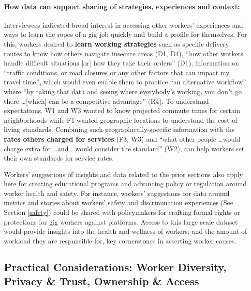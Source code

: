 \paragraph{How data can support sharing of strategies, experiences and context: }Interviewees indicated broad interest in accessing other workers' experiences and ways to learn the ropes of a gig job quickly and build a profile for themselves. For this, workers desired to \textbf{learn working strategies} such as specific delivery routes to know how others navigate insecure areas (D1, D4), ``how other workers handle difficult situations [or] how they take their orders'' (D1), information on ``traffic conditions, or road closures or any other factors that can impact my travel time'', which would even enable them to practice ``an alternative workflow'' where ``by taking that data and seeing where everybody's working, you don't go there  \dots  [which] can be a competitive advantage'' (R4). To understand expectations, W1 and W3 wanted to know projected commute times for certain neighborhoods while F1 wanted geographic locations to understand the cost of living standards. Combining such geographically-specific information with the
\textbf{rates others charged for services} (F3, W3) and ``what other people  \dots  would charge extra for  \dots  and \dots would consider the standard'' (W2), can help workers set their own standards for service rates.

Workers' suggestions of insights and data related to the prior sections also apply here for creating educational programs and  advancing policy or regulation around worker health and safety. For instance, workers’ suggestions for data around metrics and stories about workers’ safety and discrimination experiences (See Section \ref{safety}) could be shared with policymakers for crafting formal rights or protections for gig workers against platforms. Access to this large scale dataset would provide insights into the health and wellness of workers, and the amount of workload they are responsible for, key cornerstones in asserting worker causes.


\subsection{{Practical Considerations: Worker Diversity, Privacy \& Trust, Ownership \& Access}}\label{h.tycl8ab0p8ie}

